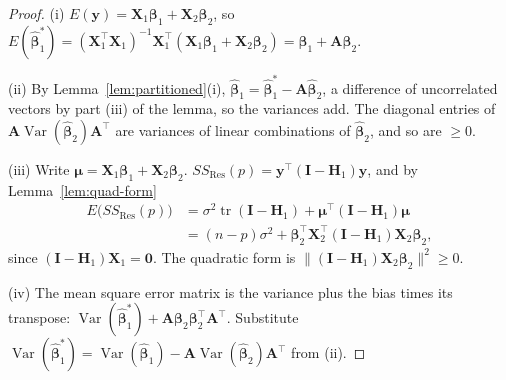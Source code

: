 \documentclass[11pt,a4paper]{article}
\numberwithin{equation}{section}
\theoremstyle{definition}
\begin{document}
\begin{proof}
(i) $E(\mathbf{y}) = \mathbf{X}_1\boldsymbol\beta_1 + \mathbf{X}_2\boldsymbol\beta_2$, so
$E(\hat{\boldsymbol\beta}_1^*) = (\mathbf{X}_1^\top\mathbf{X}_1)^{-1}\mathbf{X}_1^\top(\mathbf{X}_1\boldsymbol\beta_1 + \mathbf{X}_2\boldsymbol\beta_2) = \boldsymbol\beta_1 + \mathbf{A}\boldsymbol\beta_2$.

(ii) By Lemma~\ref{lem:partitioned}(i), $\hat{\boldsymbol\beta}_1 = \hat{\boldsymbol\beta}_1^* - \mathbf{A}\hat{\boldsymbol\beta}_2$, a difference of
uncorrelated vectors by part (iii) of the lemma, so the variances add. The diagonal entries of
$\mathbf{A}\operatorname{Var}(\hat{\boldsymbol\beta}_2)\mathbf{A}^\top$ are variances of linear combinations of $\hat{\boldsymbol\beta}_2$, and so
are $\ge 0$.

(iii) Write $\boldsymbol\mu = \mathbf{X}_1\boldsymbol\beta_1 + \mathbf{X}_2\boldsymbol\beta_2$.
$SS_{\mathrm{Res}}(p) = \mathbf{y}^\top(\mathbf{I} - \mathbf{H}_1)\mathbf{y}$, and by Lemma~\ref{lem:quad-form}
\begin{align*}
E\bigl(SS_{\mathrm{Res}}(p)\bigr) &= \sigma^2\operatorname{tr}(\mathbf{I} - \mathbf{H}_1) + \boldsymbol\mu^\top(\mathbf{I} - \mathbf{H}_1)\boldsymbol\mu \\
&= (n - p)\sigma^2 + \boldsymbol\beta_2^\top\mathbf{X}_2^\top(\mathbf{I} - \mathbf{H}_1)\mathbf{X}_2\boldsymbol\beta_2 ,
\end{align*}
since $(\mathbf{I} - \mathbf{H}_1)\mathbf{X}_1 = \mathbf{0}$. The quadratic form is $\|(\mathbf{I} - \mathbf{H}_1)\mathbf{X}_2\boldsymbol\beta_2\|^2 \ge 0$.

(iv) The mean square error matrix is the variance plus the bias times its transpose:
$\operatorname{Var}(\hat{\boldsymbol\beta}_1^*) + \mathbf{A}\boldsymbol\beta_2\boldsymbol\beta_2^\top\mathbf{A}^\top$. Substitute
$\operatorname{Var}(\hat{\boldsymbol\beta}_1^*) = \operatorname{Var}(\hat{\boldsymbol\beta}_1) - \mathbf{A}\operatorname{Var}(\hat{\boldsymbol\beta}_2)\mathbf{A}^\top$ from (ii).
\end{proof}
\end{document}
